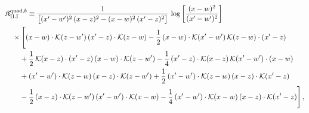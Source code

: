\begingroup\small
\begin{align}\label{eq:K-rm_quad_b_rm_II_I}
&\mathfrak{K}^{{\rm quad},b}_{\rm II.I}\equiv \frac{1}{\big[(x'-w')^{2}\,(x-z)^{2}-(x-w)^{2}\,(x'-z)^{2}\big]}\, \log\left[\frac{(x-w)^{2}}{(x'-w')^{2}}\right]\notag\\
&\quad \times\Bigg[(x-w)\cdot\mathcal{K}(z-w')\, (x'-z)\cdot\mathcal{K}(z-w) -\frac{1}{2}\, (x-w)\cdot\mathcal{K}(x'-w')\, \mathcal{K}(z-w)\cdot(x'-z)\notag\\
&\quad\quad +\frac{1}{2}\, \mathcal{K}(x-z)\cdot(x'-z)\, (x-w)\cdot\mathcal{K}(z-w') -\frac{1}{4}\, (x'-z)\cdot\mathcal{K}(x-z)\, \mathcal{K}(x'-w')\cdot(x-w)\notag\\
&\quad\quad +(x'-w')\cdot\mathcal{K}(z-w)\, (x-z)\cdot\mathcal{K}(z-w') +\frac{1}{2}\, (x'-w')\cdot\mathcal{K}(z-w)\, (x-z)\cdot\mathcal{K}(x'-z)\notag\\
&\quad\quad -\frac{1}{2}\, (x-z)\cdot\mathcal{K}(z-w')\, (x'-w')\cdot\mathcal{K}(x-w) -\frac{1}{4}\, (x'-w')\cdot\mathcal{K}(x-w)\, (x-z)\cdot\mathcal{K}(x'-z)\Bigg]\,,
\end{align}
\endgroup
